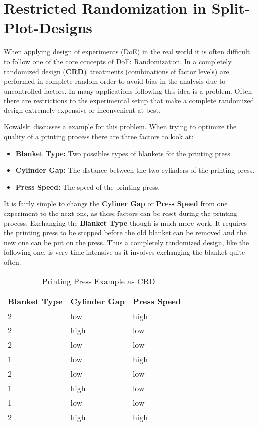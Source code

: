 \section{Restricted Randomization in Split-Plot-Designs}\label{splitplots}

When applying design of experiments (DoE) in the real world it is often difficult to follow one of the core concepts of DoE: Randomization. In a completely randomized design (\textbf{CRD}), treatments (combinations of factor levels) are performed in complete random order to avoid bias in the analysis due to uncontrolled factors. In many applications following this idea is a problem. Often there are restrictions to the experimental setup that make a complete randomized design extremely expensive or inconvenient at best. 

Kowalski \cite{kowalski:recsplitplot} discusses a example for this problem. When trying to optimize the quality of a printing process there are three factors to look at:

\begin{itemize}
\item \textbf{Blanket Type:} Two possibles types of blankets for the printing press.
\item \textbf{Cylinder Gap:} The distance between the two cylinders of the printing press.
\item \textbf{Press Speed:} The speed of the printing press.
\end{itemize}

\begin{figure}[h!]
\end{figure}

It is fairly simple to change the \textbf{Cyliner Gap} or \textbf{Press Speed} from one experiment to the next one, as these factors can be reset during the printing process. Exchanging the \textbf{Blanket Type} though is much more work. It requires the printing press to be stopped before the old blanket can be removed and the new one can be put on the press. Thus a completely randomized design, like the following one, is very time intensive as it involves exchanging the blanket quite often.


\begin{table}[h!]
\centering
\begin{tabular}{llll}
  \hline
Blanket Type & Cylinder Gap & Press Speed \\ 
  \hline
2 & low & high \\ 
2 & high & low \\ 
2 & low & low \\ 
1 & low & high \\ 
2 & low & low \\ 
1 & high & low \\ 
1 & low & low \\ 
2 & high & high \\ 
   \hline
\end{tabular}
	\caption{Printing Press Example as CRD}
\end{table}


